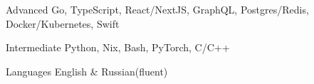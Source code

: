 
\begin{cvskills}

  \cvskill
    {Advanced}
    {Go, TypeScript, React/NextJS, GraphQL, Postgres/Redis, Docker/Kubernetes, Swift}

    \cvskill
    {Intermediate}
    {Python, Nix, Bash, PyTorch, C/C++}

  \cvskill
    {Languages}
    {English \& Russian(fluent)}

\end{cvskills}
